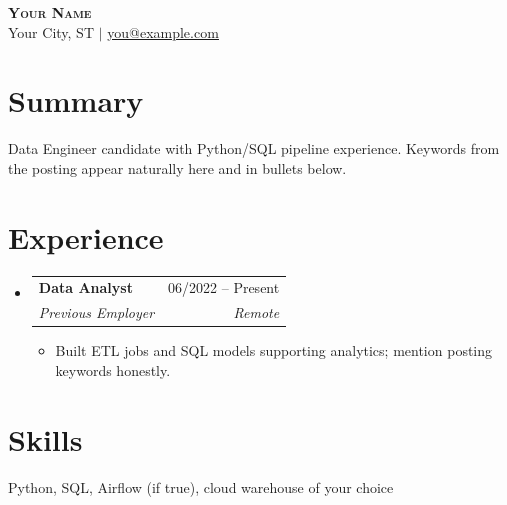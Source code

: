 \documentclass[letterpaper,11pt]{article}
\makeatletter
\newcommand{\resumeItem}[1]{\item\small{{#1 \vspace{-2pt}}}}
\newcommand{\resumeSubheading}[4]{
  \vspace{-2pt}\item
    \begin{tabular*}{0.97\textwidth}[t]{l@{\extracolsep{\fill}}r}
      \textbf{#1} & #2 \\
      \textit{\small#3} & \textit{\small #4} \\
    \end{tabular*}\vspace{-7pt}
}
\newcommand{\resumeSubHeadingListStart}{\begin{itemize}[leftmargin=0.15in, label={}]}
\newcommand{\resumeSubHeadingListEnd}{\end{itemize}}
\newcommand{\resumeItemListStart}{\begin{itemize}}
\newcommand{\resumeItemListEnd}{\end{itemize}\vspace{-5pt}}
\makeatother
\begin{document}
\begin{center}
    \textbf{\Huge \scshape Your Name} \\ \vspace{1pt}
    \small Your City, ST $|$ \href{mailto:you@example.com}{\underline{you@example.com}}
\end{center}

\section{Summary}
\begin{itemize}[leftmargin=0.15in, label={}]
  \small{\item{Data Engineer candidate with Python/SQL pipeline experience. Keywords from the posting appear naturally here and in bullets below.}}
\end{itemize}

\section{Experience}
  \resumeSubHeadingListStart
      \resumeSubheading
      {Data Analyst}{06/2022 -- Present}
      {Previous Employer}{Remote}
      \resumeItemListStart
          \resumeItem{Built ETL jobs and SQL models supporting analytics; mention posting keywords honestly.}
      \resumeItemListEnd
  \resumeSubHeadingListEnd

\section{Skills}
\begin{itemize}[leftmargin=0.15in, label={}]
  \small{\item{Python, SQL, Airflow (if true), cloud warehouse of your choice}}
\end{itemize}
\end{document}
